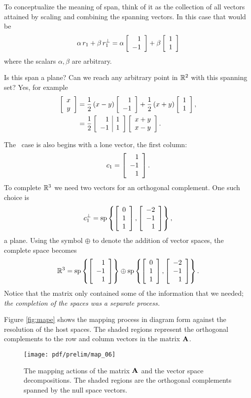 To conceptualize the meaning of span, think of it as the collection of all vectors attained by scaling and combining the spanning vectors. In this case that would be
\begin{equation}
 \alpha\, r_{1} + \beta\, r_{1}^{\perp} = \alpha \mat{r}{1\\-1} + \beta \mat{c}{1\\1}
\end{equation}
where the scalars $\alpha, \beta$ are arbitrary.

Is this span a plane? Can we reach any arbitrary point in $\real{2}$ with this spanning set? Yes, for example
\begin{equation}
  \begin{split}
    \mat{c}{x\\y} &= \frac{1}{2}\paren{x-y}\mat{r}{1\\-1} + \frac{1}{2}\paren{x+y}\mat{r}{1\\1},\\
    &= \frac{1}{2}\mat{r|c}{1&1\\-1&1}\mat{c}{x+y\\x-y}.
  \end{split}
\end{equation}

The \vvv \ case is also begins with a lone vector, the first column:
\begin{equation}
  c_{1} = \mat{r}{1\\-1\\1}.
\end{equation}
To complete $\real{3}$ we need two vectors for an orthogonal complement. One such choice is
\begin{equation}
  c_{1}^{\perp} = \spn \lst{\veca,\vecb},
\end{equation}
a plane.
Using the symbol $\oplus$ to denote the addition of vector spaces, the complete space becomes
\begin{equation}
  \real{3} = \spn \lst{\mat{r}{1\\-1\\1}} \oplus \spn \lst{\veca,\vecb}.
\end{equation}
Notice that the matrix only contained some of the information that we needed; \textit{the completion of the spaces was a separate process.}

Figure \eqref{fig:mape} shows the mapping process in diagram form against the resolution of the host spaces. The shaded regions represent the orthogonal complements to the row and column vectors in the matrix $\A{}$.
\begin{figure}[htbp] %
   \centering
   \texttt{[image: pdf/prelim/map\_06]} 
   \caption{The mapping actions of the matrix $\A{}$ and the vector space decompositions. The shaded regions are the orthogonal complements spanned by the null space vectors.}
   \label{fig:mape}
\end{figure}

